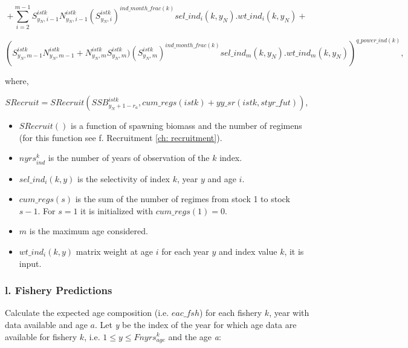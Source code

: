 \documentclass{article}
\begin{document}
\begin{equation}
+\sum_{i=2}^{m-1}S^{istk}_{y_N,i-1}N^{istk}_{y_N,i-1}{\left(S^{istk}_{y_N,i}\right)}^{ind\_month\_frac(k)} sel\_ind_i(k,y_N) . wt\_ind_i(k,y_N)+
\end{equation}

\begin{equation*}
  \left (S^{istk}_{y_N,m-1} N^{istk}_{y_N,m-1} + N^{istk}_{y_N,m}S^{istk}_{y_N,m}) {\left(S^{istk}_{y_N,m}\right)}^{ind\_month\_frac(k)} sel\_ind_m(k,y_N) . wt\_ind_m(k,y_N) \right)^{q\_power\_ind(k)},
\end{equation*}

where,

\begin{equation}
    SRecruit=SRecruit(SSB^{istk}_{y_N+1-r_a},cum\_regs(istk)+yy\_sr(istk,styr\_fut)),
\end{equation}
\begin{itemize}
    \item $SRecruit()$ is a function
of spawning biomass and the number of regimens (for this function see f. Recruitment \ref{ch: recruitment}). 
\item $nyrs^k_{ind}$ is the number of years of observation of the $k$ index.
\item $sel\_ind_i(k,y)$  is the selectivity of index $k$, year $y$ and age $i$. 
\item $cum\_regs(s)$ is the sum of the number of regimes from stock 1 to stock $s-1$. For $s=1$ it is initialized with $cum\_regs(1)=0$. 
\item $m$ is the maximum age considered.
\item $wt\_ind_i(k,y)$ matrix weight at age $i$ for each
year $y$ and index value $k$, it is input.
\end{itemize}
\subsubsection{l. Fishery Predictions} \label{ch: fshpred}

Calculate the expected age composition (i.e. $eac\_fsh$)
for each fishery $k$, year with data available and age $a$. Let \textit{y} be the index of the year for which age data are available for fishery $k$, i.e. $1\leq y \leq Fnyrs^k_{age}$ and the age \textit{a}:
\end{document}
